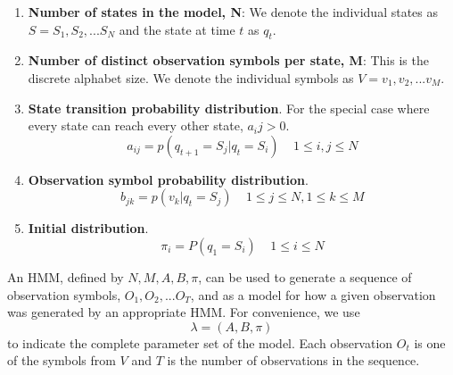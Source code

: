 \documentclass{article}
\begin{document}
						
\begin{enumerate}
\item \textbf{Number of states in the model, N}: We denote the individual states as $S={S_1, S_2, ... S_N}$ and the state at time $t$ as $q_t$.
\item \textbf{Number of distinct observation symbols per state, M}: This is the discrete alphabet size.    We denote the individual symbols as $V={v_1, v_2, ... v_M}$.
\item \textbf{State transition probability distribution}.  For the special case where every state can reach every other state, $a_ij>0$.
\begin{equation}
a_{ij} = p(q_{t+1}=S_j|q_t=S_i)  \ \ \ \ \ 1 \leq i, j \leq N
\end{equation}
\item \textbf{Observation symbol probability distribution}. 
\begin{equation}
b_{jk} = p(v_k|q_t=S_j)  \ \ \ \ \ 1 \leq j \leq N,  1 \leq k \leq M
\end{equation}
\item \textbf{Initial distribution}.
\begin{equation}
\pi_i	= P(q_1=S_i) \ \ \ \ \ 1 \leq i \leq N
\end{equation}
\end{enumerate}

An HMM, defined by $N, M, A, B, \pi$, can be used to generate a sequence of observation symbols, $O_1, O_2, ... 	O_T$, and as a model for how a given observation was generated by an appropriate HMM.  For convenience, we use
\begin{equation}
\lambda = (A, B, \pi)
\end{equation}
to indicate the complete parameter set of the model.  Each observation $O_t$ is one of the symbols from $V$ and $T$ is the number of observations in the sequence.  
\end{document}
